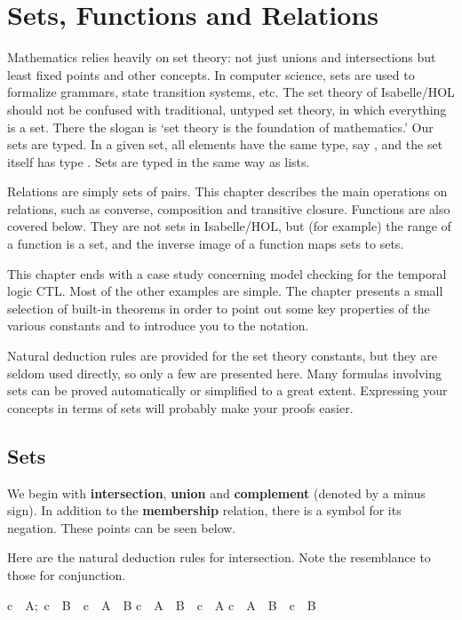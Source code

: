 \chapter{Sets, Functions and Relations}

Mathematics relies heavily on set theory: not just unions and intersections
but least fixed points and other concepts.  In computer science, sets are
used to formalize grammars, state transition systems, etc.  The set theory
of Isabelle/HOL should not be confused with traditional,  untyped set
theory, in which everything is a set. There the slogan  is `set theory is
the foundation of mathematics.' Our sets are  typed. In a given set, all
elements have the same type, say
,  and the set itself has type .  Sets are typed in the
same way as lists. 

Relations are simply sets of pairs.  This chapter describes
the main operations on relations, such as converse, composition and
transitive closure.  Functions are also covered below.  They are not sets in
Isabelle/HOL, but (for example) the range of a function is a set,
and the inverse image of a function maps sets to sets.

This chapter ends with a case study concerning model checking for the
temporal logic CTL\@.  Most of the other examples are simple.  The
chapter presents a small selection of built-in theorems in order to point
out some key properties of the various constants and to introduce you to
the notation. 

Natural deduction rules are provided for the set theory constants, but they
are seldom used directly, so only a few are presented here.  Many formulas
involving sets can be proved automatically or simplified to a great extent.
Expressing your concepts in terms of sets will probably  make your proofs
easier.


\section{Sets}

We begin with \textbf{intersection}, \textbf{union} and \textbf{complement}  (denoted 
by a minus sign). In addition to the \textbf{membership} relation, there 
is a symbol for its negation. These points can be seen below.  

Here are the natural deduction rules for intersection.  Note the 
resemblance to those for conjunction.  
\begin{isabelle}
\isasymlbrakk c\ \isasymin\
A;\ c\ \isasymin\
B\isasymrbrakk\ \isasymLongrightarrow\ c\
\isasymin\ A\ \isasyminter\ B%
\rulename{IntI}\isanewline
c\ \isasymin\ A\ \isasyminter\
B\ \isasymLongrightarrow\ c\ \isasymin\
A%
\rulename{IntD1}\isanewline
c\ \isasymin\ A\ \isasyminter\
B\ \isasymLongrightarrow\ c\ \isasymin\
B%
\rulename{IntD2}%
\end{isabelle}

